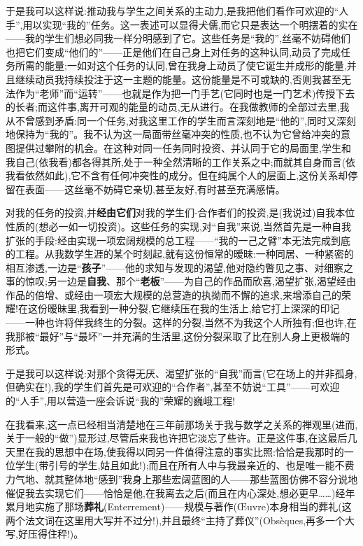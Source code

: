 于是我可以这样说:推动我与学生之间关系的主动力,是我把他们看作可欢迎的“人手”,用以实现“我的”任务。这一表述可以显得犬儒,而它只是表达一个明摆着的实在——我的学生们想必同我一样分明感到了它。这些任务是“我的”,丝毫不妨碍他们也把它们变成“他们的”——正是他们在自己身上对任务的这种认同,动员了完成任务所需的能量;一如对这个任务的认同,曾在我身上动员了使它诞生并成形的能量,并且继续动员我持续投注于这一主题的能量。这份能量是不可或缺的,否则我甚至无法作为“老师”而“运转”——也就是作为把一门手艺(它同时也是一门艺术)传授下去的长者;而这件事,离开可观的能量的动员,无从进行。在我做教师的全部过去里,我从不曾感到矛盾\dmark{}:同一个任务,对我这里工作的学生而言深刻地是“他的”,同时又深刻地保持为“我的”。我不认为这一局面带丝毫冲突的性质,也不认为它曾给冲突的意图提供过攀附的机会。在这种对同一任务同时投资、并认同于它的局面里,学生和我自己(依我看)都各得其所,处于一种全然清晰的工作关系之中;而就其自身而言(依我看依然如此),它不含有任何冲突性的成分。但在纯属个人的层面上,这份关系却停留在表面——这丝毫不妨碍它亲切,甚至友好,有时甚至充满感情。

对我的任务的投资,并\textbf{经由它们}对我的学生们-合作者们的投资,是(我说过)自我本位性质的(想必一如一切投资)。这些任务的实现,对“自我”来说,当然首先是一种自我扩张的手段:经由实现一项宏阔规模的总工程——“我的一己之臂”本无法完成到底的工程。从我数学生涯的某个时刻起,就有这份恒常的暧昧:一种同居、一种紧密的相互渗透,一边是“\textbf{孩子}”——他的求知与发现的渴望,他对隐约瞥见之事、对细察之事的惊叹;另一边是\textbf{自我}、那个“\textbf{老板}”——为自己的作品而欣喜,渴望扩张,渴望经由作品的倍增、或经由一项宏大规模的总营造的执拗而不懈的追求,来增添自己的荣耀!在这份暧昧里,我看到一种分裂,它继续压在我的生活上,给它打上深深的印记——一种也许将伴我终生的分裂。这样的分裂,当然不为我这个人所独有;但也许,在我那被“最好”与“最坏”一并充满的生活里,这份分裂采取了比在别人身上更极端的形式。

于是我可以这样说:对那个贪得无厌、渴望扩张的“自我”而言(它在场上的并非孤身,但确实在!),我的学生们首先是可欢迎的“合作者”,甚至不妨说“工具”——可欢迎的“人手”,用以营造一座会诉说“我的”荣耀的巍峨工程!

在我看来,这一点已经相当清楚地\dmark{}在三年前那场关于我与数学之关系的禅观里(进而,关于一般的“做”)显形过,尽管后来我也许把它淡忘了些许。正是这件事,在这最后几天里在我的思想中在场,使我得以同另一件值得注意的事实比照:恰恰是我那时的一位学生(带引号的学生,姑且如此!);而且在所有人中与我最亲近的、也是唯一能不费力气地、就其整体地“感到”我身上那些宏阔蓝图的人——那些蓝图仿佛不容分说地催促我去实现它们——恰恰是他,在我离去之后(而且在内心深处,想必更早……)经年累月地实施了那场\textbf{葬礼}(Enterrement)——规模与著作(Œuvre)本身相当的葬礼(这两个法文词在这里用大写并不过分!),并且最终“主持了葬仪”(Obsèques,再多一个大写,好压得住秤!)。

